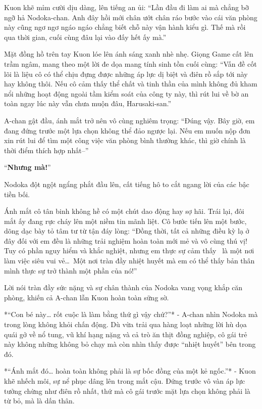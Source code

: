 \documentclass[../main.tex]{subfiles}
\begin{document}
Kuon khẽ mỉm cười dịu dàng, lên tiếng an ủi: ``Lần đầu đi làm ai mà chẳng bỡ ngỡ hả Nodoka-chan. Anh đây hồi mới chân ướt chân ráo bước vào cái văn phòng này cũng ngơ ngơ ngáo ngáo chẳng biết chỗ này vận hành kiểu gì. Thế mà rồi qua thời gian, cuối cùng đâu lại vào đấy hết ấy mà.''

Mặt đồng hồ trên tay Kuon lóe lên ánh sáng xanh nhè nhẹ. Giọng Game cất lên trầm ngâm, mang theo một lời đe dọa mang tính sinh tồn cuối cùng: ``Vấn đề cốt lõi là liệu cô có thể chịu đựng được những áp lực dị biệt và điên rồ sắp tới này hay không thôi. Nếu cô cảm thấy thể chất và tinh thần của mình không đủ kham nổi những hoạt động ngoài tầm kiểm soát của công ty này, thì rút lui về bờ an toàn ngay lúc này vẫn chưa muộn đâu, Harusaki-san.''

A-chan gật đầu, ánh mắt trở nên vô cùng nghiêm trọng: ``Đúng vậy. Bây giờ, em đang đứng trước một lựa chọn không thể đảo ngược lại. Nếu em muốn nộp đơn xin rút lui để tìm một công việc văn phòng bình thường khác, thì giờ chính là thời điểm thích hợp nhất--''

``\textbf{Nhưng mà!}''

Nodoka đột ngột ngẩng phắt đầu lên, cất tiếng hô to cắt ngang lời của các bậc tiền bối.

Ánh mắt cô tân binh không hề có một chút dao động hay sợ hãi. Trái lại, đôi mắt ấy đang rực cháy lên một niềm tin mãnh liệt. Cô bước tiến lên một bước, dõng dạc bày tỏ tâm tư từ tận đáy lòng: ``Đồng thời, tất cả những điều kỳ lạ ở đây đối với em đều là những trải nghiệm hoàn toàn mới mẻ và vô cùng thú vị! Tuy có phần nguy hiểm và khắc nghiệt, nhưng em thực sự cảm thấy \hll\ là một nơi làm việc siêu vui vẻ\dots\ Một nơi tràn đầy nhiệt huyết mà em có thể thấy bản thân mình thực sự trở thành một phần của nó!''

Lời nói tràn đầy sức nặng và sự chân thành của Nodoka vang vọng khắp căn phòng, khiến cả A-chan lẫn Kuon hoàn toàn sững sờ.

*“Con bé này… rốt cuộc là làm bằng thứ gì vậy chứ?”* - A-chan nhìn Nodoka mà trong lòng không khỏi chấn động. Dù vừa trải qua hàng loạt những lời hù dọa quái gở về nổ tung, vũ khí hạng nặng và cả trò ăn thịt đồng nghiệp, cô gái trẻ này không những không bỏ chạy mà còn nhìn thấy được ``nhiệt huyết'' bên trong đó.

*“Ánh mắt đó… hoàn toàn không phải là sự bốc đồng của một kẻ ngốc.”* - Kuon khẽ nhếch môi, sự nể phục dâng lên trong mắt cậu. Đứng trước vô vàn áp lực tưởng chừng như điên rồ nhất, thứ mà cô gái trước mặt lựa chọn không phải là từ bỏ, mà là dấn thân.
\end{document}
